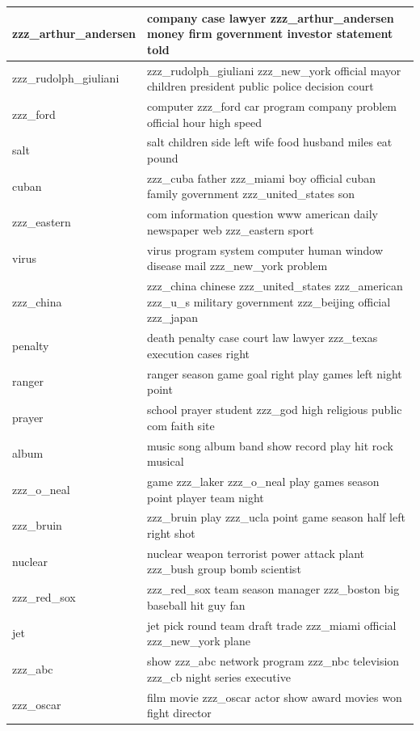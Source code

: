 \documentclass{article}
\begin{document}
\begin{tabular}{ l | l }
    zzz\_arthur\_andersen & company case lawyer zzz\_arthur\_andersen money firm government investor statement told \\ \hline 
    zzz\_rudolph\_giuliani & zzz\_rudolph\_giuliani zzz\_new\_york official mayor children president public police decision court \\ \hline 
    zzz\_ford & computer zzz\_ford car program company problem official hour high speed \\ \hline 
    salt & salt children side left wife food husband miles eat pound \\ \hline 
    cuban & zzz\_cuba father zzz\_miami boy official cuban family government zzz\_united\_states son \\ \hline 
    zzz\_eastern & com information question www american daily newspaper web zzz\_eastern sport \\ \hline 
    virus & virus program system computer human window disease mail zzz\_new\_york problem \\ \hline 
    zzz\_china & zzz\_china chinese zzz\_united\_states zzz\_american zzz\_u\_s military government zzz\_beijing official zzz\_japan \\ \hline 
    penalty & death penalty case court law lawyer zzz\_texas execution cases right \\ \hline 
    ranger & ranger season game goal right play games left night point \\ \hline 
    prayer & school prayer student zzz\_god high religious public com faith site \\ \hline 
    album & music song album band show record play hit rock musical \\ \hline 
    zzz\_o\_neal & game zzz\_laker zzz\_o\_neal play games season point player team night \\ \hline 
    zzz\_bruin & zzz\_bruin play zzz\_ucla point game season half left right shot \\ \hline 
    nuclear & nuclear weapon terrorist power attack plant zzz\_bush group bomb scientist \\ \hline 
    zzz\_red\_sox & zzz\_red\_sox team season manager zzz\_boston big baseball hit guy fan \\ \hline 
    jet & jet pick round team draft trade zzz\_miami official zzz\_new\_york plane \\ \hline 
    zzz\_abc & show zzz\_abc network program zzz\_nbc television zzz\_cb night series executive \\ \hline 
    zzz\_oscar & film movie zzz\_oscar actor show award movies won fight director \\ \hline 
    
    
  \end{tabular}
\end{document}
